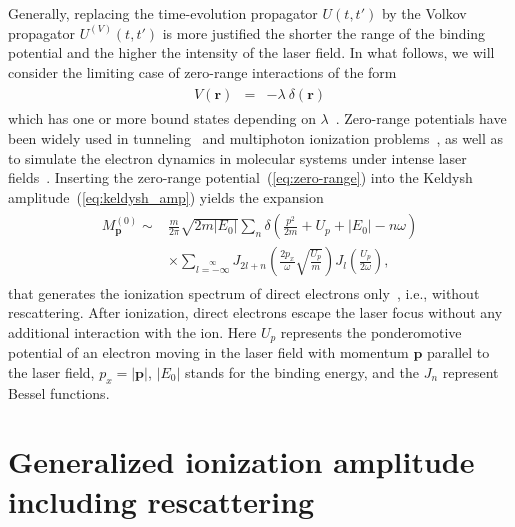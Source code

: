 Generally, replacing the time-evolution propagator $U(t,t')$ by the
Volkov propagator $U^{(V)}(t,t')$ is more justified the shorter the
range of the binding potential and the higher the intensity of the
laser field. In what follows, we will consider the limiting case of
zero-range interactions of the form
%
\begin{eqnarray}
\label{eq:zero-range}
\begin{split}
V(\mathbf{r}) & = & -\lambda\ \delta(\mathbf{r})
\end{split}
\end{eqnarray}
%
which has one or more bound states depending on
$\lambda$~\cite{Becker_rescattering1994, Becker_ati2002}. Zero-range
potentials have been widely used in tunneling~\cite{Kleber_zeroV1994}
and multiphoton ionization problems~\cite{Becker_zeroV1990}, as well
as to simulate the electron dynamics in molecular systems under
intense laser fields~\cite{frolov_zeroV2013}. Inserting the zero-range
potential~(\ref{eq:zero-range}) into the Keldysh
amplitude~(\ref{eq:keldysh_amp}) yields the expansion
%
\begin{eqnarray}
\label{eq:keldysh_amp_explicit}
\begin{split}
M_{\mathbf{p}}^{(0)} \sim &
\frac{m}{2\pi}\sqrt{2m|E_{0}|}
\sum\limits_{n} \delta\left(\frac{p^{2}}{2m} + U_{p} + |E_{0}| - n\omega\right) \\
& \times \sum\limits_{l=-\infty}\limits^{\infty} J_{2l+n}\left(\frac{2p_{x}}{\omega}
\sqrt{\frac{U_{p}}{m}} \right) J_{l}\left( \frac{U_{p}}{2\omega} \right),
\end{split}
\end{eqnarray}
%
that generates the ionization spectrum of direct electrons
only~\cite{Kopold_1997sfa}, i.e., without rescattering. After
ionization, direct electrons escape the laser focus without any
additional interaction with the ion. Here $U_{p}$ represents the
ponderomotive potential of an electron moving in the laser field with
momentum $\mathbf{p}$ parallel to the laser field, $p_{x} =
|\mathbf{p}|$, $|E_{0}|$ stands for the binding energy, and the
$J_{n}$ represent Bessel functions.


\section{\label{kopold_sfa} Generalized ionization amplitude including rescattering}

